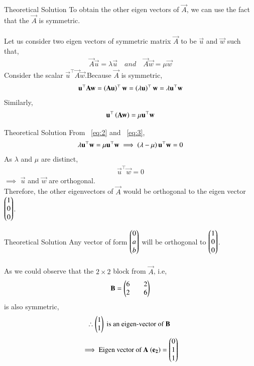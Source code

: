 \documentclass{beamer}
\begin{document}
\begin{frame}{Theoretical Solution}
To obtain the other eigen vectors of $\vec{A}$, we can use the fact that the $\vec{A}$ is symmetric.\\
\\
Let us consider two eigen vectors of symmetric matrix $\vec{A}$ to be $\vec{u}$ and $\vec{w}$ such that,
\begin{align}
    \vec{A}\vec{u}=\lambda\vec{u} \quad and \quad \vec{A}\vec{w}=\mu \vec{w}
\end{align}
Consider the scalar $\vec{u}^{\top}\vec{A}\vec{w}$.Because $\vec{A}$ is symmetric,
\begin{align}
    \mathbf{u}^{\top}\mathbf{A}\mathbf{w}=\left(\mathbf{A}\mathbf{u}\right)^{\top}\mathbf{w}=\left(\lambda \mathbf{u}\right)^{\top}\mathbf{w}=\lambda\mathbf{u}^{\top}\mathbf{w}
    \label{eq:2}
\end{align}
Similarly,
\begin{align}
    \mathbf{u}^{\top}\left(\mathbf{A}\mathbf{w}\right)=\mu\mathbf{u}^{\top}\mathbf{w}
    \label{eq:3}
\end{align}

\end{frame}

\begin{frame}{Theoretical Solution}
From ~\eqref{eq:2} and ~\eqref{eq:3},
\begin{align}
    \lambda\mathbf{u}^{\top}\mathbf{w}=\mu \mathbf{u}^{\top}\mathbf{w}
    \implies \left(\lambda-\mu\right)\mathbf{u}^{\top}\mathbf{w}=0
\end{align}
As $\lambda$ and $\mu$ are distinct,
\begin{align}
    \vec{u}^{\top}\vec{w}=0 \label{eq:4}
\end{align}
$\implies$ $\vec{u}$ and $\vec{w}$ are orthogonal.\\
Therefore, the other eigenvectors of $\vec{A}$ would be orthogonal to the eigen vector $\begin{pmatrix}1\\0\\0\end{pmatrix}$.
\end{frame}

\begin{frame}{Theoretical Solution}
Any vector of form $\begin{pmatrix}0\\a\\b\end{pmatrix}$ will be orthogonal to $\begin{pmatrix}1\\0\\0\end{pmatrix}$.\\
\\
As we could observe that the $2\times 2$ block from $\vec{A}$, i.e,
\begin{align}
    \mathbf{B}=\begin{pmatrix}6&&2\\2&&6\end{pmatrix}
\end{align}
is also symmetric,
\begin{align}
    \therefore \begin{pmatrix}1\\1\end{pmatrix} \text{ is an eigen-vector of $\mathbf{B}$ }
\end{align}
\begin{align}
      \implies \text{Eigen vector of $\mathbf{A}$ $\left(\mathbf{e_2}\right)$}=\begin{pmatrix}0\\1\\1\end{pmatrix}
\end{align}
\end{frame}
\end{document}
